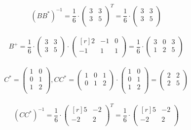 \documentclass[12pt]{article}
\theoremstyle{definition}
\numberwithin{equation}{section}
\begin{document}
	\[(BB^*)^{-1} = \frac{1}{6} \cdot \begin{pmatrix}
	3 & 3 \\         
	3 & 5 \\
	\end{pmatrix}^T = \frac{1}{6} \cdot \begin{pmatrix}
	3 & 3 \\         
	3 & 5 \\
	\end{pmatrix}\]\\
	\[B^+ = \frac{1}{6} \cdot \begin{pmatrix}
	3 & 3 \\         
	3 & 5 \\
	\end{pmatrix} \cdot \begin{pmatrix}[r]
	2 & -1 & 0 \\         
	-1 & 1 & 1 \\
	\end{pmatrix} = \frac{1}{6} \cdot \begin{pmatrix}
	3 & 0 & 3 \\         
	1 & 2 & 5 \\
	\end{pmatrix}\]\\
	\[C^* = \begin{pmatrix}
	1 & 0 \\         
	0 & 1 \\
	1 & 2 \\
	\end{pmatrix}, CC^* = \begin{pmatrix}
	1 & 0 & 1 \\         
	0 & 1 & 2 \\
	\end{pmatrix} \cdot \begin{pmatrix}
	1 & 0 \\         
	0 & 1 \\
	1 & 2 \\
	\end{pmatrix} = \begin{pmatrix}
	2 & 2 \\         
	2 & 5 \\
	\end{pmatrix}\]\\
	\[(CC^*)^{-1} = \frac{1}{6} \cdot \begin{pmatrix}[r]
	5 & -2 \\         
	-2 & 2 \\
	\end{pmatrix}^T = \frac{1}{6} \cdot \begin{pmatrix}[r]
	5 & -2 \\         
	-2 & 2 \\
	\end{pmatrix}\]\\
\end{document}
